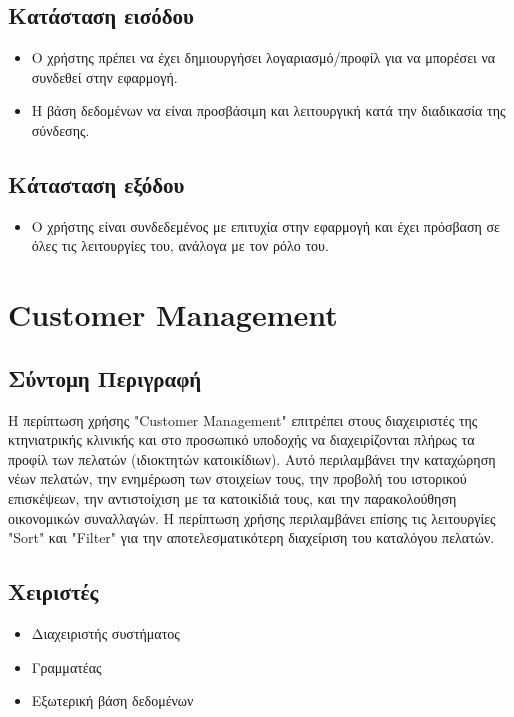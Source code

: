 \documentclass[12pt,a4paper,twoside]{book}
\begin{document}
\subsection{Κατάσταση εισόδου} %
\begin{itemize}
  \item Ο χρήστης πρέπει να έχει δημιουργήσει λογαριασμό/προφίλ για να μπορέσει να συνδεθεί στην εφαρμογή. %
  \item Η βάση δεδομένων να είναι προσβάσιμη και λειτουργική κατά την διαδικασία της σύνδεσης. %
\end{itemize}

\subsection{Κάτασταση εξόδου} %
\begin{itemize}
  \item Ο χρήστης είναι συνδεδεμένος με επιτυχία στην εφαρμογή και έχει πρόσβαση σε όλες τις λειτουργίες του, ανάλογα με τον ρόλο του. %
\end{itemize}

\section{Customer Management}

\subsection{Σύντομη Περιγραφή}
Η περίπτωση χρήσης "Customer Management" επιτρέπει στους διαχειριστές της κτηνιατρικής κλινικής και στο προσωπικό υποδοχής να διαχειρίζονται πλήρως τα προφίλ των πελατών (ιδιοκτητών κατοικίδιων). Αυτό περιλαμβάνει την καταχώρηση νέων πελατών, την ενημέρωση των στοιχείων τους, την προβολή του ιστορικού επισκέψεων, την αντιστοίχιση με τα κατοικίδιά τους, και την παρακολούθηση οικονομικών συναλλαγών. Η περίπτωση χρήσης περιλαμβάνει επίσης τις λειτουργίες "Sort" και "Filter" για την αποτελεσματικότερη διαχείριση του καταλόγου πελατών. %

\subsection{Χειριστές}
\begin{itemize}
  \item Διαχειριστής συστήματος
  \item Γραμματέας
  \item Εξωτερική βάση δεδομένων %
\end{itemize}
\end{document}
